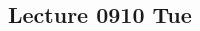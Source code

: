 \documentclass{article}
\begin{document}
\begin{multicols}{2}

\tableofcontents
\clearpage

\section{Lecture 0910 Tue}
\begin{mydefinition}

\end{mydefinition}


\end{multicols}
\end{document}
